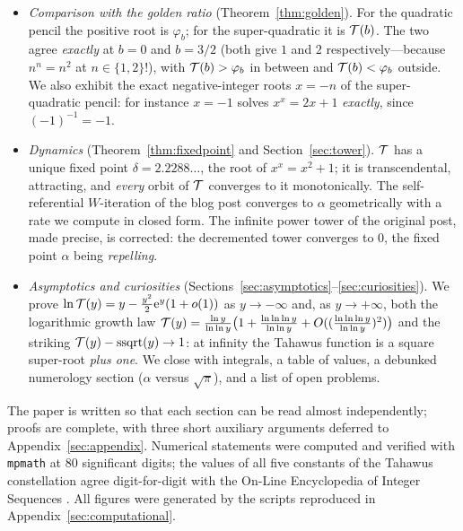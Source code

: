 \begin{itemize}[leftmargin=1.6em]
\item \emph{Comparison with the golden ratio}
(Theorem~\ref{thm:golden}). For the quadratic pencil the positive root
is $\varphi_b$; for the super-quadratic it is $\mathcal{T}(b)$. The two agree
\emph{exactly} at $b = 0$ and $b = 3/2$ (both give $1$ and $2$
respectively---because $n^{n} = n^{2}$ at $n \in \{1,2\}$!), with
$\mathcal{T}(b) > \varphi_b$ in between and $\mathcal{T}(b) < \varphi_b$ outside. We
also exhibit the exact negative-integer roots $x = -n$ of the
super-quadratic pencil: for instance $x = -1$ solves
$x^{x} = 2x + 1$ \emph{exactly}, since $(-1)^{-1} = -1$.

\item \emph{Dynamics} (Theorem~\ref{thm:fixedpoint} and
Section~\ref{sec:tower}). $\mathcal{T}$ has a unique fixed point
$\delta = 2.2288\ldots$, the root of $x^{x} = x^{2}+1$; it is
transcendental, attracting, and \emph{every} orbit of $\mathcal{T}$ converges to
it monotonically. The self-referential $W$-iteration of the blog post
converges to $\alpha$ geometrically with a rate we compute in closed
form. The infinite power tower of the original post, made precise, is
corrected: the decremented tower converges to $0$, the fixed point
$\alpha$ being \emph{repelling}.

\item \emph{Asymptotics and curiosities}
(Sections~\ref{sec:asymptotics}--\ref{sec:curiosities}). We prove
$\ln \mathcal{T}(y) = y - \tfrac{y^{2}}{2}\mathrm{e}^{y}(1+o(1))$ as $y \to -\infty$
and, as $y \to +\infty$, both the logarithmic growth law
$\mathcal{T}(y) = \frac{\ln y}{\ln\ln y}\big(1 + \tfrac{\ln\ln\ln y}{\ln\ln y} +
O((\tfrac{\ln\ln\ln y}{\ln\ln y})^{2})\big)$ and the striking
$\mathcal{T}(y) - \operatorname{ssqrt}(y) \to 1$: at infinity the Tahawus function is a
square super-root \emph{plus one}. We close with integrals, a table of
values, a debunked numerology section ($\alpha$ versus $\sqrt\pi$), and
a list of open problems.

\end{itemize}

The paper is written so that each section can be read almost
independently; proofs are complete, with three short auxiliary arguments
deferred to Appendix~\ref{sec:appendix}. Numerical statements were
computed and verified with \texttt{mpmath} \cite{mpmath} at 80
significant digits; the values of all five constants of the Tahawus
constellation agree digit-for-digit with the On-Line Encyclopedia of
Integer Sequences \cite{a124930,a226568,a085846,a169862}. All figures
were generated by the scripts reproduced in
Appendix~\ref{sec:computational}.

